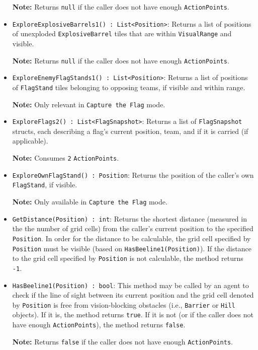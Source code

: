 \documentclass[a4paper,english,DIV=16,11pt,parskip=half,dvipsnames,listof=totoc,index=totoc,bibliography=totoc]{scrartcl}
\begin{document}
\begin{itemize}
  \faLightbulbO\: \textbf{Note:} Returns \texttt{null} if the caller does not have enough \texttt{ActionPoints}.
  \item \texttt{ExploreExplosiveBarrels1() :~List<Position>}: Returns a list of positions of unexploded \texttt{ExplosiveBarrel} tiles that are within \texttt{VisualRange} and visible.
  
  \faLightbulbO\: \textbf{Note:} Returns \texttt{null} if the caller does not have enough \texttt{ActionPoints}.
  \item \texttt{ExploreEnemyFlagStands1() :~List<Position>}: Returns a list of positions of \texttt{FlagStand} tiles belonging to opposing teams, if visible and within range.
  
  \faLightbulbO\: \textbf{Note:} Only relevant in \texttt{Capture the Flag} mode.
  \item \texttt{ExploreFlags2() :~List<FlagSnapshot>}: Returns a list of \texttt{FlagSnapshot} structs, each describing a flag's current position, team, and if it is carried (if applicable).
  
  \faLightbulbO\: \textbf{Note:} Consumes \texttt{2} \texttt{ActionPoints}.
  \item \texttt{ExploreOwnFlagStand() :~Position}: Returns the position of the caller's own \texttt{FlagStand}, if visible.
  
  \faLightbulbO\: \textbf{Note:} Only available in \texttt{Capture the Flag} mode.
  \item \texttt{GetDistance(Position) :~int}: Returns the shortest distance (measured in the the number of grid cells) from the caller's current position to the specified \texttt{Position}. In order for the distance to be calculable, the grid cell specified by \texttt{Position} must be visible (based on \texttt{HasBeeline1(Position)}). If the distance to the grid cell specified by \texttt{Position} is not calculable, the method returns \texttt{-1}.
  \item \texttt{HasBeeline1(Position) :~bool}: This method may be called by an agent to check if the line of sight between its current position and the grid cell denoted by \texttt{Position} is free from vision-blocking obstacles (i.e., \texttt{Barrier} or \texttt{Hill} objects). If it is, the method returns \texttt{true}. If it is not (or if the caller does not have enough \texttt{ActionPoints}), the method returns \texttt{false}.

  \faLightbulbO\: \textbf{Note:} Returns \texttt{false} if the caller does not have enough \texttt{ActionPoints}.
\end{itemize}
%
\end{document}
